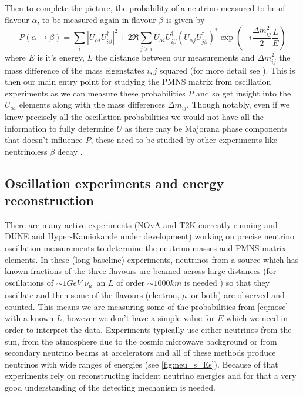 \documentclass[a4paper,12pt]{article}
\newcommand{\Mu}{$\mu$}
\newcommand{\Nm}{$\nu_\mu$}
\begin{document}
Then to complete the picture, the probability of a neutrino measured to be of flavour $\alpha$, to be measured again in flavour $\beta$ is given by 
\begin{equation} \label{eq:nosc}
    P(\alpha \rightarrow \beta) = \sum_i |U_{\alpha i} U^\dag_{i \beta}|^2 + 2\Re \sum_{j>i} U_{\alpha i} U^\dag_{i \beta} (U_{\alpha j} U^\dag_{j \beta})^* \exp(-i\frac{\Delta m^2_{ij}}{2}\frac{L}{E})
\end{equation}
where $E$ is it's energy, $L$ the distance between our measurements and $\Delta m^2_{ij}$ the mass difference of the mass eigenstates $i, j$ squared (for more detail see \cite{zuberNeutrinoPhysics2020}).
This is then our main entry point for studying the PMNS matrix from oscillation experiments as we can measure these probabilities $P$ and so get insight into the $U_{\alpha i}$ elements along with the mass differences $\Delta m_{ij}$.
Though notably, even if we knew precisely all the oscillation probabilities we would not have all the information to fully determine $U$ as there may be Majorana phase components that doesn't influence $P$, these need to be studied by other experiments like neutrinoless $\beta$ decay \cite{degouveaManifestCPViolation2003}.

\subsection{Oscillation experiments and energy reconstruction}\label{sec:exanderec}
There are many active experiments (NOvA\cite{pattersonNOvAExperimentStatus2013} and T2K\cite{abeT2KExperiment2011} currently running and DUNE\cite{falconeDeepUndergroundNeutrino2022} and Hyper-Kamiokande\cite{yokoyamaHyperKamiokandeExperiment2017} under development) working on precise neutrino oscillation measurements to determine the neutrino masses and PMNS matrix elements.
In these (long-baseline) experiments, neutrinos from a source which has known fractions of the three flavours are beamed across large distances (for oscillations of $\sim 1\si{GeV}$ \Nm\ an $L$ of order $\sim 1000\si{km}$ is needed \cite{mezzettoThreeFlavorOscillationsAccelerator2020}) so that they oscillate and then some of the flavours (electron, \Mu\ or both) are observed and counted.
This means we are measuring some of the probabilities from \cref{eq:nosc} with a known $L$, however we don't have a simple value for $E$ which we need in order to interpret the data.
Experiments typically use either neutrinos from the sun, from the atmosphere due to the cosmic microwave background or from secondary neutrino beams at accelerators and all of these methods produce neutrinos with wide ranges of energies (see \cref{fig:neu_s_Es}).
Because of that experiments rely on reconstructing incident neutrino energies and for that a very good understanding of the detecting mechanism is needed.
\end{document}
